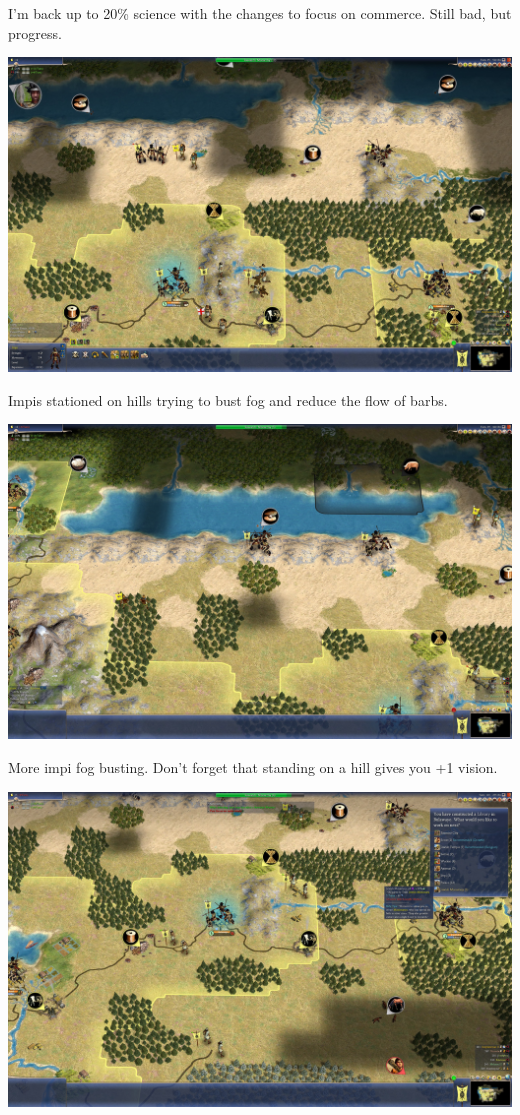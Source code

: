 \documentclass[10pt]{article}
\begin{document}
I'm back up to 20\% science with the changes to focus on commerce. Still bad, but progress.

\includegraphics[width=1.0\textwidth]{72}

Impis stationed on hills trying to bust fog and reduce the flow of barbs.

\includegraphics[width=1.0\textwidth]{75}

More impi fog busting. Don't forget that standing on a hill gives you +1 vision.

\includegraphics[width=1.0\textwidth]{76}
\end{document}
